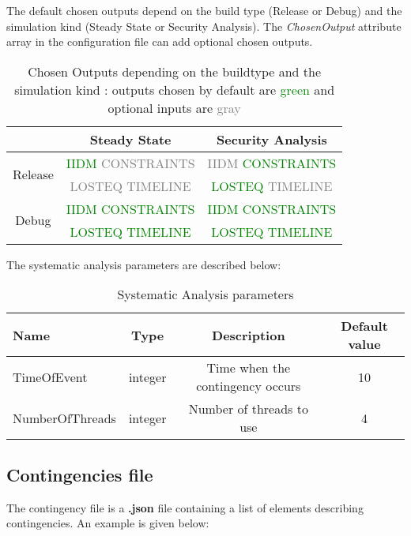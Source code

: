 \documentclass[a4paper, 12pt]{report}
\begin{document}
\begin{table}[H]
The default chosen outputs depend on the build type (Release or Debug) and the simulation kind (Steady State or Security Analysis). The \textit{ChosenOutput} attribute array in the configuration file can add optional chosen outputs.
\center
\begin{tabular}{| c | c | c |}
\cline{2-3}
\multicolumn{1}{c|}{} & Steady State & Security Analysis \\
\hline
\multirow{2}{*}{Release} & \textcolor{green}{\small{IIDM} \textcolor{gray}{CONSTRAINTS}} & \small{\textcolor{gray}{IIDM} \textcolor{green}{CONSTRAINTS}} \\
& \small{\textcolor{gray}{LOSTEQ}} \textcolor{gray}{TIMELINE} & \small{\textcolor{green}{LOSTEQ} \textcolor{gray}{TIMELINE}} \\
\hline
\multirow{2}{*}{Debug} & \textcolor{green}{\small{IIDM CONSTRAINTS}} & \textcolor{green}{\small{IIDM CONSTRAINTS}} \\
& \textcolor{green}{\small{LOSTEQ TIMELINE}} & \textcolor{green}{\small{LOSTEQ TIMELINE}} \\
\hline
\end{tabular}
\caption{Chosen Outputs depending on the buildtype and the simulation kind : outputs chosen by default are \textcolor{green}{green} and optional inputs are \textcolor{gray}{gray}}
\end{table}

The systematic analysis parameters are described below:

\begin{table}[H]
\center
\begin{tabular}{ l | c | c | c }
\toprule
\textbf{{Name}} & \textbf{{Type}} & \textbf{{Description}} & \textbf{{Default value}}\\
\midrule
\rowcolor{white}
TimeOfEvent & integer & Time when the contingency occurs & 10 \\
\rowcolor{gray!10}
NumberOfThreads & integer & Number of threads to use & 4 \\
\bottomrule
\end{tabular}
\caption{Systematic Analysis parameters}
\end{table}

\subsection{Contingencies file}

The contingency file is a \textbf{.json} file containing a list of elements describing contingencies. An example is given below:

\end{document}
